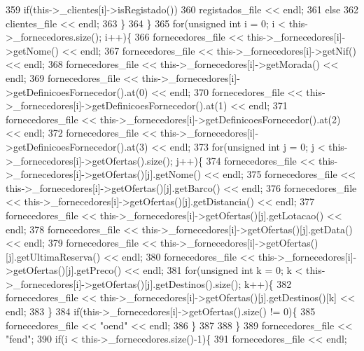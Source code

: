 \begin{DoxyCode}
359             \textcolor{keywordflow}{if}(this->\_clientes[i]->isRegistado())
360                         registados\_file << endl;
361             \textcolor{keywordflow}{else}
362                         clientes\_file << endl;
363         \}
364     \}
365     \textcolor{keywordflow}{for}(\textcolor{keywordtype}{unsigned} \textcolor{keywordtype}{int} i = 0; i < this->\_fornecedores.size(); i++)\{
366         fornecedores\_file << this->\_fornecedores[i]->getNome() << endl;
367         fornecedores\_file << this->\_fornecedores[i]->getNif() << endl;
368         fornecedores\_file << this->\_fornecedores[i]->getMorada() << endl;
369         fornecedores\_file << this->\_fornecedores[i]->getDefinicoesFornecedor().at(0) << endl;
370         fornecedores\_file << this->\_fornecedores[i]->getDefinicoesFornecedor().at(1) << endl;
371         fornecedores\_file << this->\_fornecedores[i]->getDefinicoesFornecedor().at(2) << endl;
372         fornecedores\_file << this->\_fornecedores[i]->getDefinicoesFornecedor().at(3) << endl;
373         \textcolor{keywordflow}{for}(\textcolor{keywordtype}{unsigned} \textcolor{keywordtype}{int} j = 0; j < this->\_fornecedores[i]->getOfertas().size(); j++)\{
374             fornecedores\_file << this->\_fornecedores[i]->getOfertas()[j].getNome() << endl;
375             fornecedores\_file << this->\_fornecedores[i]->getOfertas()[j].getBarco() << endl;
376             fornecedores\_file << this->\_fornecedores[i]->getOfertas()[j].getDistancia() << endl;
377             fornecedores\_file << this->\_fornecedores[i]->getOfertas()[j].getLotacao() << endl;
378             fornecedores\_file << this->\_fornecedores[i]->getOfertas()[j].getData() << endl;
379             fornecedores\_file << this->\_fornecedores[i]->getOfertas()[j].getUltimaReserva() << endl;
380             fornecedores\_file << this->\_fornecedores[i]->getOfertas()[j].getPreco() << endl;
381             \textcolor{keywordflow}{for}(\textcolor{keywordtype}{unsigned} \textcolor{keywordtype}{int} k = 0; k < this->\_fornecedores[i]->getOfertas()[j].getDestinos().size(); k++)\{
382                 fornecedores\_file << this->\_fornecedores[i]->getOfertas()[j].getDestinos()[k] << endl;
383             \}
384             \textcolor{keywordflow}{if}(this->\_fornecedores[i]->getOfertas().size() != 0)\{
385                 fornecedores\_file << \textcolor{stringliteral}{"oend"} << endl;
386             \}
387 
388         \}
389         fornecedores\_file << \textcolor{stringliteral}{"fend"};
390         \textcolor{keywordflow}{if}(i < this->\_fornecedores.size()-1)\{
391             fornecedores\_file << endl;

\end{DoxyCode}
